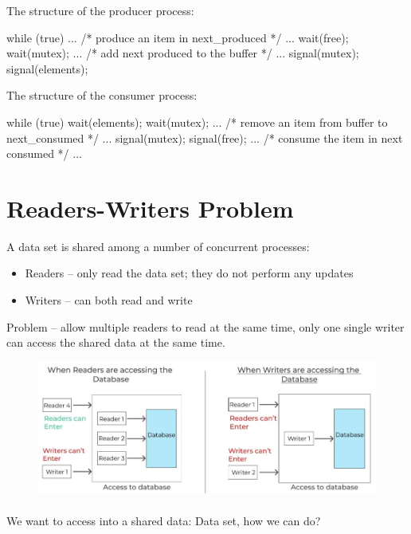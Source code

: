 The structure of the producer process:

\begin{codeInC}
while (true) {
         ...
         /* produce an item in next_produced */
         ...
     wait(free);
     wait(mutex);
         ...
         /* add next produced to the buffer */
         ...
     signal(mutex);
     signal(elements);
 }
\end{codeInC}


The structure of the consumer process:

\begin{codeInC}
while (true) {
     wait(elements);
     wait(mutex);
         ...
         /* remove an item from buffer to next_consumed */
         ...
     signal(mutex);
     signal(free);
         ...
         /* consume the item in next consumed */
         ...
 }
\end{codeInC}


\section{Readers-Writers Problem}
A data set is shared among a number of concurrent processes:

\begin{itemize}
    \item Readers – only read the data set; they do not perform any updates
    \item Writers – can both read and write
\end{itemize}

Problem – allow multiple readers to read at the same time, only one single writer can access the shared data at the same
time.


\begin{figure}[htbp]
    \centering
    \includegraphics[width=0.85\linewidth]{img/read_asd.png}
\end{figure}

\paragraph{}
We want to access into a shared data: Data set, how we can do?

